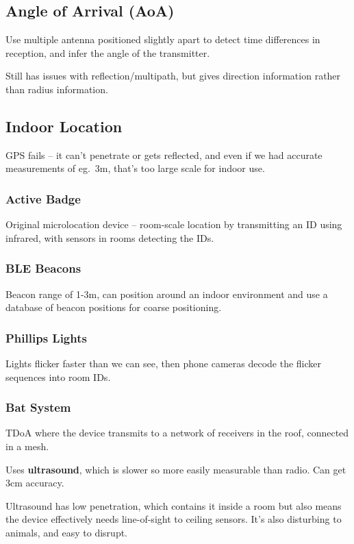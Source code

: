 \documentclass[a4paper, 11pt]{article}
\begin{document}
{    \subsection*{Angle of Arrival (AoA)}
    {
        Use multiple antenna positioned slightly apart to detect time differences in reception, and infer the angle of the transmitter.

        Still has issues with reflection/multipath, but gives direction information rather than radius information.
    }
    \subsection*{Indoor Location}
    {
        GPS fails -- it can't penetrate or gets reflected, and even if we had accurate measurements of eg.\ 3m, that's too large scale for indoor use.

        \subsubsection*{Active Badge}
        {
            Original microlocation device -- room-scale location by transmitting an ID using infrared, with sensors in rooms detecting the IDs.
        }
        \subsubsection*{BLE Beacons}
        {
            Beacon range of 1-3m, can position around an indoor environment and use a database of beacon positions for coarse positioning.
        }
        \subsubsection*{Phillips Lights}
        {
            Lights flicker faster than we can see, then phone cameras decode the flicker sequences into room IDs.
        }
        \subsubsection*{Bat System}
        {
            TDoA where the device transmits to a network of receivers in the roof, connected in a mesh.

            Uses \textbf{ultrasound}, which is slower so more easily measurable than radio. Can get 3cm accuracy.

            Ultrasound has low penetration, which contains it inside a room but also means the device effectively needs line-of-sight to ceiling sensors. It's also disturbing to animals, and easy to disrupt.
        }
}}
\end{document}
